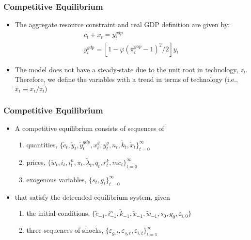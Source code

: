 \documentclass[11pt]{beamer}
\begin{document}
\begin{frame}\frametitle{Competitive Equilibrium}\setlength{\itemindent}{-1.2em}
\begin{itemize} \setlength{\itemsep}{8pt}
\item <1-|handout:1>The aggregate resource constraint and real GDP definition are given by:
\begin{gather*}
  c_t + x_t = y_t^{gdp}\\
  y_t^{gdp} = [1 - \varphi(\pi_t^{gap}-1)^2/2]y_t
\end{gather*}
\item <2-|handout:1>The model does not have a steady-state due to the unit root in technology, $z_t$. Therefore, we define the variables with a trend in terms of technology (i.e., $\tilde{x}_t \equiv x_t/z_t$)
\end{itemize}
\end{frame}
\begin{frame}\frametitle{Competitive Equilibrium}
\begin{itemize} \setlength{\itemsep}{10pt}
\item <1-|handout:1>A competitive equilibrium consists of sequences of 
\begin{enumerate} \setlength{\itemsep}{5pt}
\item quantities, $\{\tilde{c}_t, \tilde{y}_t, \tilde{y}_t^{gdp}, x^g_t, y^g_t, n_t, \tilde{k}_t, \tilde{x}_t\}_{t=0}^\infty$ \item prices, $\{\tilde{w}_t, i_t, i^n_t, \pi_t, \tilde{\lambda}_t, q_t, r^k_t, mc_t\}_{t=0}^\infty$
\item exogenous variables, $\{s_t,g_t\}_{t=0}^\infty$
\end{enumerate}
\item <2-|handout:1>that satisfy the detrended equilibrium system, given 
\begin{enumerate}\setlength{\itemsep}{5pt}
\item the initial conditions, $\{\tilde{c}_{-1}, i^n_{-1}, \tilde{k}_{-1}, \tilde{x}_{-1}, \tilde{w}_{-1}, s_0, g_0, \varepsilon_{i,0}\}$
\item three sequences of shocks, $\{\varepsilon_{g,t}, \varepsilon_{s,t}, \varepsilon_{i,t}\}_{t=1}^\infty$
\end{enumerate}
\end{itemize}
\end{frame}
\end{document}

